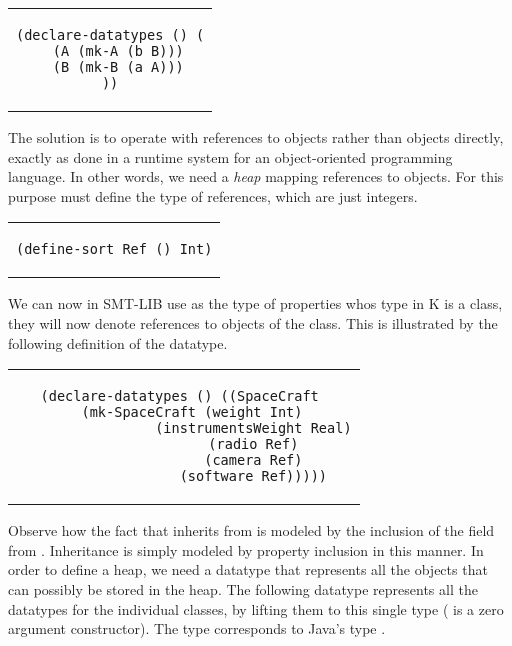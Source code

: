 \lstset{language=SMT,numbers=none}

\begin{center}
\begin{tabular}{c}
\begin{lstlisting}
(declare-datatypes () (
  (A (mk-A (b B)))
  (B (mk-B (a A)))
))
\end{lstlisting}
\end{tabular}
\end{center}

The solution is to operate with references to objects
rather than objects directly, exactly as done in a runtime system for an
object-oriented programming language. In other words, we need a
{\em heap} mapping references to objects. For this purpose must define
the type of references, which are just integers.

\begin{center}
\begin{tabular}{c}
\begin{lstlisting}
(define-sort Ref () Int)
\end{lstlisting}
\end{tabular}
\end{center}

We can now in SMT-LIB use  as the type of properties whos 
type in K is a class, they will now denote references to objects of the class.
This is illustrated by the following definition of the  datatype.

\begin{center}
\begin{tabular}{c}
\begin{lstlisting}  
(declare-datatypes () ((SpaceCraft 
  (mk-SpaceCraft (weight Int)
                 (instrumentsWeight Real)
                 (radio Ref)
                 (camera Ref)
                 (software Ref)))))
\end{lstlisting}
\end{tabular}
\end{center}

Observe how the fact that  inherits from
 is modeled by the inclusion of the  field
from . Inheritance is simply modeled by property
inclusion in this manner.  In order to define a heap, we need a
datatype that represents all the objects that can possibly be stored
in the heap. The following datatype  represents all the
datatypes for the individual classes, by lifting them to this single
type ( is a zero argument constructor). The type 
corresponds to Java's type .

